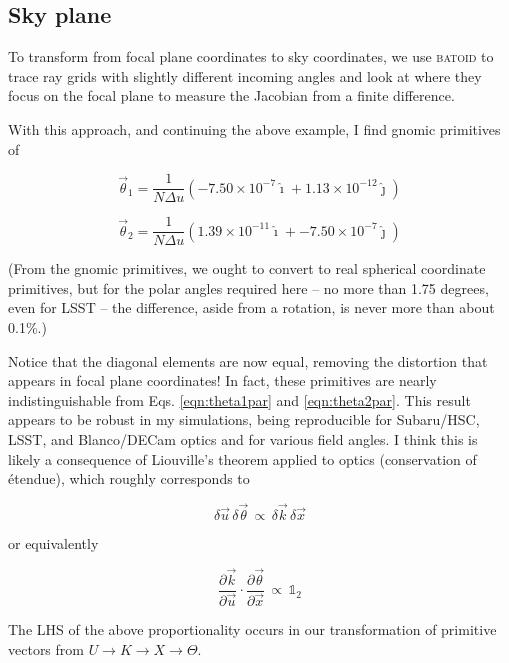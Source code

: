 \documentclass{article}
\begin{document}
\subsection{Sky plane}

To transform from focal plane coordinates to sky coordinates, we use \textsc{batoid} to trace ray
grids with slightly different incoming angles and look at where they focus on the focal plane to
measure the Jacobian from a finite difference.

With this approach, and continuing the above example, I find gnomic primitives of

\begin{equation}
    \vec{\theta}_1 = \frac{1}{N \Delta u} (-7.50 \times 10^{-7} \hat{\imath} + 1.13 \times 10^{-12} \hat{\jmath})
\end{equation}

\begin{equation}
    \vec{\theta}_2 = \frac{1}{N \Delta u} (1.39 \times 10^{-11} \hat{\imath} + -7.50 \times 10^{-7} \hat{\jmath})
\end{equation}

(From the gnomic primitives, we ought to convert to real spherical coordinate primitives, but for
the polar angles required here -- no more than 1.75 degrees, even for LSST -- the difference, aside
from a rotation, is never more than about 0.1\%.)

Notice that the diagonal elements are now equal, removing the distortion that appears in focal plane
coordinates!  In fact, these primitives are nearly indistinguishable from Eqs. \ref{eqn:theta1par}
and \ref{eqn:theta2par}.  This result appears to be robust in my simulations, being reproducible for
Subaru/HSC, LSST, and Blanco/DECam optics and for various field angles.  I think this is likely a
consequence of Liouville's theorem applied to optics (conservation of étendue), which roughly
corresponds to

\begin{equation}
    \delta \vec{u}\, \delta \vec{\theta}\, \propto\, \delta \vec{k}\, \delta \vec{x}
\end{equation}

or equivalently

\begin{equation}
    \frac{\partial \vec{k}}{\partial \vec{u}} \cdot \frac{\partial \vec{\theta}}{\partial \vec{x}}\, \propto\, \mathbb{1}_2
\end{equation}

The LHS of the above proportionality occurs in our transformation of primitive vectors from $U
\rightarrow K \rightarrow X \rightarrow \Theta$.
\end{document}
